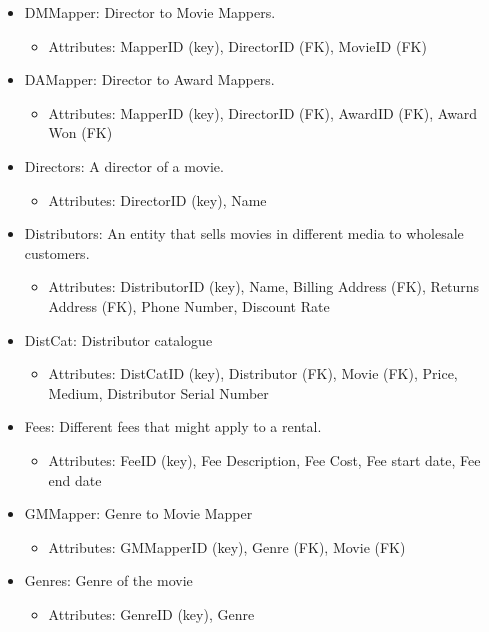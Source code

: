 \documentclass[letterpaper,12pt]{article}
\begin{document}
\begin{itemize}
\begin{itemize}
	      \end{itemize}
	\item DMMapper: Director to Movie Mappers.
	      \begin{itemize}
		      \item Attributes: MapperID (key), DirectorID (FK), MovieID (FK)
	      \end{itemize}
	\item DAMapper: Director to Award Mappers.
	      \begin{itemize}
		      \item Attributes: MapperID (key), DirectorID (FK), AwardID (FK), Award Won (FK)
	      \end{itemize}
	\item Directors: A director of a movie.
	      \begin{itemize}
		      \item Attributes: DirectorID (key), Name
	      \end{itemize}
	\item Distributors: An entity that sells movies in different media to wholesale customers.
	      \begin{itemize}
		      \item Attributes: DistributorID (key), Name, Billing Address (FK), Returns Address (FK), Phone Number, Discount Rate
	      \end{itemize}
	\item DistCat: Distributor catalogue
	      \begin{itemize}
		      \item Attributes: DistCatID (key), Distributor (FK), Movie (FK), Price, Medium, Distributor Serial Number
	      \end{itemize}
	\item Fees: Different fees that might apply to a rental.
	      \begin{itemize}
		      \item Attributes: FeeID (key), Fee Description, Fee Cost, Fee start date, Fee end date
	      \end{itemize}
	\item GMMapper: Genre to Movie Mapper
	      \begin{itemize}
		      \item Attributes: GMMapperID (key), Genre (FK), Movie (FK)
	      \end{itemize}
	\item Genres: Genre of the movie
	      \begin{itemize}
		      \item Attributes: GenreID (key), Genre

\end{itemize}
\end{itemize}
\end{document}
